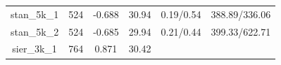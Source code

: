 \documentclass[]{article}
\begin{document}
\begin{longtable}[]{@{}cccccc@{}}
\begin{minipage}[t]{0.12\columnwidth}
stan\_5k\_1\strut
\end{minipage} & \begin{minipage}[t]{0.07\columnwidth}\centering\strut
524\strut
\end{minipage} & \begin{minipage}[t]{0.12\columnwidth}\centering\strut
-0.688\strut
\end{minipage} & \begin{minipage}[t]{0.14\columnwidth}\centering\strut
30.94\strut
\end{minipage} & \begin{minipage}[t]{0.17\columnwidth}\centering\strut
0.19/0.54\strut
\end{minipage} & \begin{minipage}[t]{0.22\columnwidth}\centering\strut
388.89/336.06\strut
\end{minipage}\tabularnewline
\begin{minipage}[t]{0.12\columnwidth}\centering\strut
stan\_5k\_2\strut
\end{minipage} & \begin{minipage}[t]{0.07\columnwidth}\centering\strut
524\strut
\end{minipage} & \begin{minipage}[t]{0.12\columnwidth}\centering\strut
-0.685\strut
\end{minipage} & \begin{minipage}[t]{0.14\columnwidth}\centering\strut
29.94\strut
\end{minipage} & \begin{minipage}[t]{0.17\columnwidth}\centering\strut
0.21/0.44\strut
\end{minipage} & \begin{minipage}[t]{0.22\columnwidth}\centering\strut
399.33/622.71\strut
\end{minipage}\tabularnewline
\begin{minipage}[t]{0.12\columnwidth}\centering\strut
sier\_3k\_1\strut
\end{minipage} & \begin{minipage}[t]{0.07\columnwidth}\centering\strut
764\strut
\end{minipage} & \begin{minipage}[t]{0.12\columnwidth}\centering\strut
0.871\strut
\end{minipage} & \begin{minipage}[t]{0.14\columnwidth}\centering\strut
30.42\strut
\end{minipage} & \begin{minipage}[t]{0.17\columnwidth}\centering\strut

\end{minipage}
\end{longtable}
\end{document}
